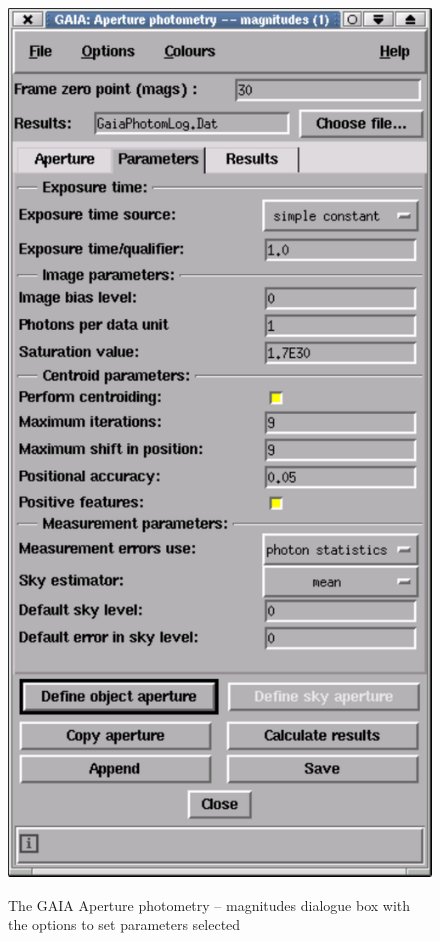 \documentclass[twoside,11pt]{article}
\begin{document}
\begin{enumerate}
\begin{figure}[htbp]
     \includegraphics[totalheight=5.5in]{sc6_gaia4}
     \begin{quote}
     \caption[Setting parameters in the {\sf Aperture photometry --
      magnitudes} dialogue box]
      {The GAIA {\sf Aperture photometry -- magnitudes} dialogue box with
      the options to set parameters selected
     \label{g5} }
     \end{quote}
  \end{figure}


\end{enumerate}
\end{document}

